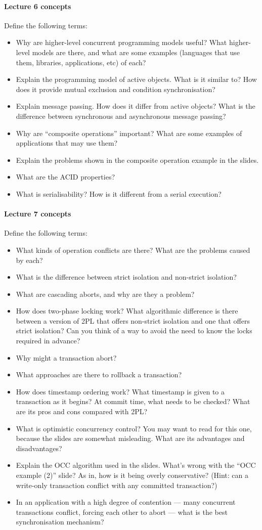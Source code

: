 \documentclass[12pt,a4paper,oneside,openright]{report}
\newcommand{\question}[2]{\paragraph{#1} #2}
\begin{document}
\question{Lecture 6 concepts}{Define the following terms:
  \begin{itemize}
  \item Why are higher-level concurrent programming models useful?
    What higher-level models are there, and what are some examples
    (languages that use them, libraries, applications, etc) of each?
  \item Explain the programming model of active objects. What is it
    similar to? How does it provide mutual exclusion and condition
    synchronisation?
  \item Explain message passing. How does it differ from active
    objects? What is the difference between synchronous and
    asynchronous message passing?
  \item Why are ``composite operations'' important? What are some
    examples of applications that may use them?
  \item Explain the problems shown in the composite operation example
    in the slides.
  \item What are the ACID properties?
  \item What is serialisability? How is it different from a serial
    execution?
  \end{itemize}
}

\question{Lecture 7 concepts}{Define the following terms:
  \begin{itemize}
  \item What kinds of operation conflicts are there? What are the
    problems caused by each?
  \item What is the difference between strict isolation and non-strict
    isolation?
  \item What are cascading aborts, and why are they a problem?
  \item How does two-phase locking work? What algorithmic difference
    is there between a version of 2PL that offers non-strict isolation
    and one that offers strict isolation? Can you think of a way to
    avoid the need to know the locks required in advance?
  \item Why might a transaction abort?
  \item What approaches are there to rollback a transaction?
  \item How does timestamp ordering work? What timestamp is given to a
    transaction as it begins? At commit time, what needs to be
    checked? What are its pros and cons compared with 2PL?
  \item What is optimistic concurrency control? You may want to read
    \cite[Chapter~20.6]{bacon2003operating} for this one, because the
    slides are somewhat misleading. What are its advantages and
    disadvantages?
  \item Explain the OCC algorithm used in the slides. What's wrong
    with the ``OCC example (2)'' slide? As in, how is it being overly
    conservative? (Hint: can a write-only transaction conflict with
    any committed transaction?)
  \item In an application with a high degree of contention --- many
    concurrent transactions conflict, forcing each other to abort ---
    what is the best synchronisation mechanism?
  \end{itemize}
}
\end{document}
